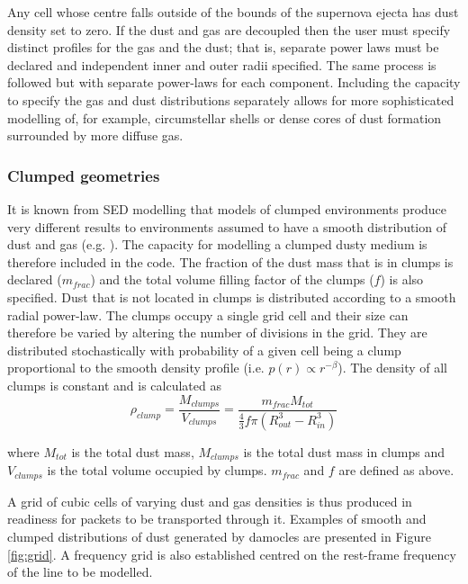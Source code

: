 Any cell whose centre falls outside of the bounds of the supernova ejecta has dust density set to zero.  If the dust and gas are decoupled then the user must specify distinct profiles for the gas and the dust; that is, separate power laws must be declared and independent inner and outer radii specified.  The same process is followed but with separate power-laws for each component.  Including the capacity to specify the gas and dust distributions separately allows for more sophisticated modelling of, for example, circumstellar shells or dense cores of dust formation surrounded by more diffuse gas.

\subsubsection{Clumped geometries}

It is known from SED modelling that models of clumped environments produce very different results to environments assumed to have a smooth distribution of dust and gas (e.g. \citet{Bianchi2000,Ercolano2007,Owen2015}).  %
The capacity for modelling a clumped dusty medium is therefore included in the code.  The fraction of the dust mass that is in clumps is declared ($m_{frac}$) and the total volume filling factor of the clumps ($f$) is also specified.  Dust that is not located in clumps is distributed according to a smooth radial power-law.  The clumps occupy  a single grid cell and their size can therefore be varied by altering the number of divisions in the grid.  They are distributed stochastically with probability of a given cell being a clump proportional to the smooth density profile (i.e. $p(r) \propto r^{-\beta}$).  The density of all clumps is constant and is calculated as 
\begin{equation}
\rho_{clump}=\frac{M_{clumps}}{V_{clumps}}=\frac{m_{frac}M_{tot}}{\frac{4}{3} f\pi (R_{out}^{3}-R_{in}^{3} )}
\end{equation}

\noindent where $M_{tot}$ is the total dust mass, $M_{clumps}$ is the total dust mass in clumps and $V_{clumps}$ is the total volume occupied by clumps.  $m_{frac}$ and $f$ are defined as above.

A grid of cubic cells of varying dust and gas densities is thus produced in readiness for packets to be transported through it.  Examples of smooth and clumped distributions of dust generated by {\sc damocles} are presented in Figure \ref{fig:grid}.  A frequency grid is also established centred on the rest-frame frequency of the line to be modelled.



